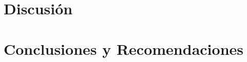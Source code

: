 \documentclass[12pt,letterpaper]{report}
\begin{document}
	\chapter{Discusión}
	
	\chapter{Conclusiones y Recomendaciones}
	
	\cleardoublepage
	\printbibliography
	
\end{document}

